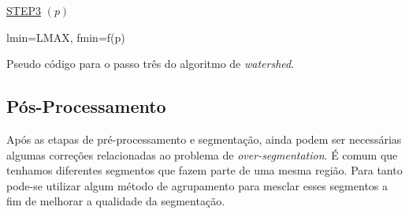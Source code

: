 \begin{algorithm}[H]
\SetAlgoLined


    \underline{STEP3} $(p)$\;
		
		lmin=LMAX, fmin=f(p)\\
    
    
 
 
\caption{Pseudo código para o passo três do algoritmo de \textit{watershed}.\cite{ruparelia2012implementation}}
\end{algorithm}




\subsection{Pós-Processamento}
Após as etapas de pré-processamento e segmentação, ainda podem ser necessárias algumas correções relacionadas ao problema de \textit{over-segmentation}. É comum que tenhamos diferentes segmentos que fazem parte de uma mesma região. Para tanto pode-se utilizar algum método de  agrupamento para mesclar esses segmentos a fim de melhorar a qualidade da segmentação.